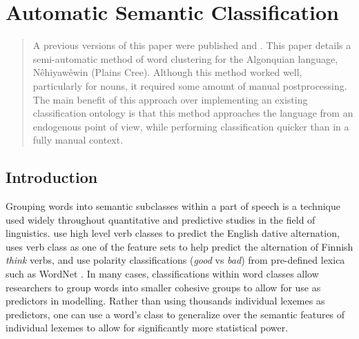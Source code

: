 	\chapter{Automatic Semantic Classification}
	\label{ch:semantics}

\begin{abstract}
A previous versions of this paper were published \cite{harrigan-arppe-2021-leveraging} and \cite{harriganPACsem}. This paper details a semi-automatic method of word clustering for the Algonquian language, Nêhiyawêwin (Plains Cree). Although this method worked well, particularly for nouns, it required some amount of manual postprocessing. The main benefit of this approach over implementing an existing classification ontology is that this method approaches the language from an endogenous point of view, while performing classification quicker than in a fully manual context.
\end{abstract}

\section{Introduction}

Grouping words into semantic subclasses within a part of speech is a technique used widely throughout quantitative and predictive studies in the field of linguistics. \citet{bresnan2007predicting} use high level verb classes to predict the English dative alternation, \citet{arppe2008univariate} uses verb class as one of the feature sets to help predict the alternation of Finnish \textit{think} verbs, and \citet{yu2017refining} use polarity classifications (\textit{good} vs \textit{bad}) from pre-defined lexica such as WordNet \cite{miller1998wordnet}. In many cases, classifications within word classes allow researchers to group words into smaller cohesive groups to allow for use as predictors in modelling. Rather than using thousands individual lexemes as predictors, one can use a word's class to generalize over the semantic features of individual lexemes to allow for significantly more statistical power. 

